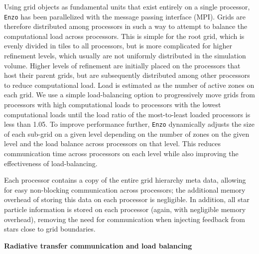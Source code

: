\documentclass[12pt]{article} %
\begin{document}
Using grid objects as fundamental units that exist entirely on a single processor, \texttt{Enzo} has been parallelized with the message passing interface (MPI). Grids are therefore distributed among processors in such a way to attempt to balance the computational load across processors. This is simple for the root grid, which is evenly divided in tiles to all processors, but is more complicated for higher refinement levels, which usually are not uniformly distributed in the simulation volume. Higher levels of refinement are initially placed on the processors that host their parent grids, but are subsequently distributed among other processors to reduce computational load. Load is estimated as the number of active zones on each grid. We use a simple load-balancing option to progressively move grids from processors with high computational loads to processors with the lowest computational loads until the load ratio of the most-to-least loaded processors is less than 1.05. To improve performance further, \texttt{Enzo} dynamically adjusts the size of each sub-grid on a given level depending on the number of zones on the given level and the load balance across processors on that level. This reduces communication time across processors on each level while also improving the effectiveness of load-balancing.

Each processor contains a copy of the entire grid hierarchy meta data, allowing for easy non-blocking communication across processors; the additional memory overhead of storing this data on each processor is negligible. In addition, all star particle information is stored on each processor (again, with negligible memory overhead), removing the need for communication when injecting feedback from stars close to grid boundaries.

\textbf{Radiative transfer communication and load balancing}

\end{document}
